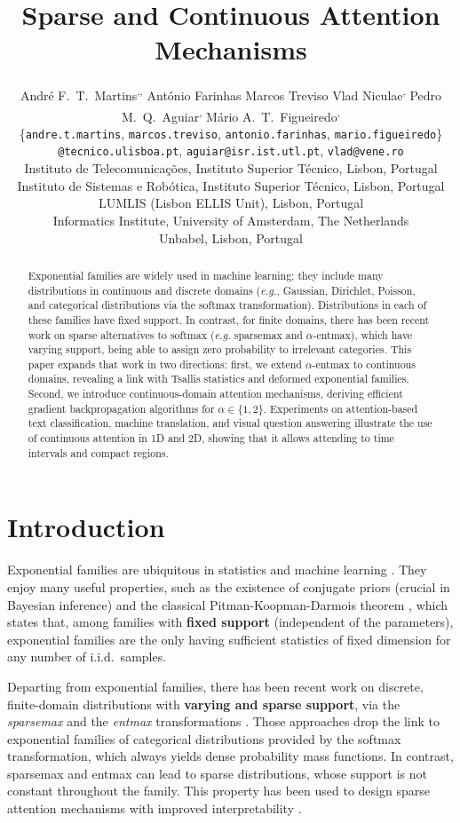 \documentclass{article}
\title{Sparse and Continuous Attention Mechanisms}
\author{Andr\'e F.~T.~Martins\textsuperscript{\markIT,\markLUMLIS,\markUnbabel} 
  \And
  Ant\'onio Farinhas\textsuperscript{\markIT} 
  \And
  Marcos Treviso\textsuperscript{\markIT} 
  \AND
  Vlad Niculae\textsuperscript{\markUvA,\markIT}\And
  Pedro M.~Q.~Aguiar\textsuperscript{\markISR,\markLUMLIS} 
  \And
  M\'ario A.~T.~Figueiredo\textsuperscript{\markIT,\markLUMLIS} 
  \AND \\[-4ex]
  \{{\tt andre.t.martins}, 
{\tt marcos.treviso}, 
{\tt antonio.farinhas}, 
{\tt mario.figueiredo}\}\\{\tt @tecnico.ulisboa.pt}, 
{\tt aguiar@isr.ist.utl.pt}, {\tt vlad@vene.ro}\\[2ex]
  \textsuperscript{\markIT{}}Instituto de Telecomunica\c{c}\~oes,  Instituto Superior Técnico, Lisbon, Portugal \\
  \textsuperscript{\markISR{}}Instituto de Sistemas e Rob\'otica, Instituto Superior Técnico, Lisbon, Portugal \\
  \textsuperscript{\markLUMLIS{}}LUMLIS (Lisbon ELLIS Unit), Lisbon, Portugal \\
  \textsuperscript{\markUvA{}}Informatics Institute, University of Amsterdam, The Netherlands \\
  \textsuperscript{\markUnbabel{}}Unbabel, Lisbon, Portugal
}
\newcommand{\remove}[1]{}
\begin{document}
\maketitle
\begin{abstract}
Exponential families are widely used in machine learning; they include many distributions in continuous and discrete domains (\textit{e.g.}, Gaussian, Dirichlet, Poisson, and categorical distributions via the softmax transformation). Distributions in each of these families have fixed support. In contrast, for finite domains, there has been recent work on sparse alternatives to softmax (\textit{e.g.} sparsemax and $\alpha$-entmax), which have varying support, being able to assign zero probability to irrelevant categories.
This paper expands that work in two directions: first, we extend $\alpha$-entmax\remove{and Fenchel-Young (FY) losses} to continuous domains, revealing a link with Tsallis statistics and deformed exponential families. 
Second, we introduce continuous-domain attention mechanisms, deriving efficient gradient backpropagation algorithms for $\alpha \in \{1,2\}$.
Experiments on  attention-based text classification, machine translation, and visual question answering  illustrate the use of continuous attention in 1D and 2D, showing that it allows attending to time intervals and compact regions.\remove{and FY-based interval regression on weather data.}
\end{abstract}

\section{Introduction}

Exponential families are ubiquitous in statistics and machine learning \citep{brown1986fundamentals,barndorff2014information}. They enjoy many useful properties, such as the existence of conjugate priors (crucial in Bayesian inference) and 
the classical Pitman-Koopman-Darmois theorem \citep{pitman1936sufficient,darmois1935lois,koopman1936distributions}, which states that,
among families with {\bf fixed support} (independent of the parameters), exponential families are the only having sufficient statistics of fixed dimension for any number of i.i.d.\ samples.

Departing from exponential families, there has been recent work on discrete, finite-domain distributions with {\bf varying and sparse support},  via the \textit{sparsemax} and the \textit{entmax} transformations \citep{Martins2016ICML,blondel2020learning,peters2019sparse}. 
Those approaches drop the link to exponential families of categorical distributions provided by the softmax transformation, which always yields dense probability mass functions. In contrast, sparsemax and entmax can lead to sparse distributions, whose support is not constant throughout the family. This property has been used \remove{to obtain new loss functions for multi-label classification and sparse sequence-to-sequence problems, as well as} to design sparse attention mechanisms with improved interpretability \citep{peters2019sparse,correia2019adaptively}.
\end{document}
